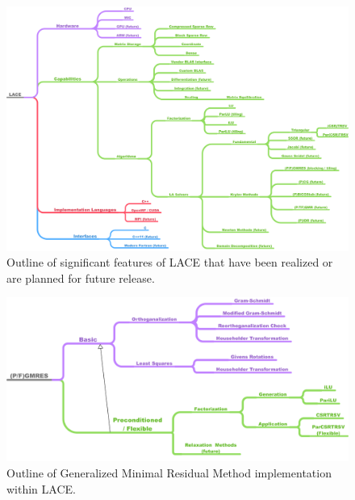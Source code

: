 \documentclass[12pt,portrait]{article}
\begin{document}

\begin{figure}\centering
  \includegraphics[width=\columnwidth]{../images/LACE_1b.png}
  \caption{Outline of significant features of LACE that have been realized or are planned for future release.}
  \vspace{-10pt}
  \label{fig:LACE}
\end{figure}


\begin{figure}\centering
  \includegraphics[width=\columnwidth]{../images/GMRES_1b.png}
  \caption{Outline of Generalized Minimal Residual Method implementation within LACE.}
  \vspace{-10pt}
  \label{fig:LACE_GMRES}
\end{figure}
\end{document}
